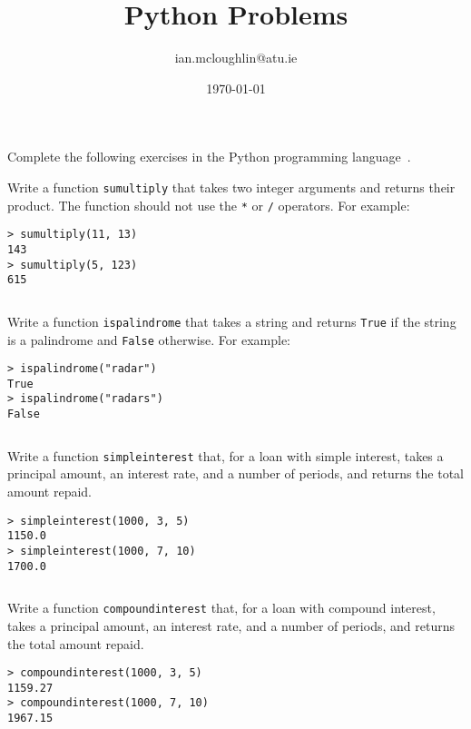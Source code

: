 \documentclass{iansproblems}
\title{Python Problems}
\author{ian.mcloughlin@atu.ie}
\date{\today}
\begin{document}
\maketitle

\noindent
Complete the following exercises in the Python programming language~\autocite{pythonwebsite}.

\begin{questions}

\question
Write a function \texttt{sumultiply} that takes two integer arguments and returns their product.
The function should not use the \texttt{*} or \texttt{/} operators.
For example:
\begin{verbatim}
> sumultiply(11, 13)
143
> sumultiply(5, 123)
615
\end{verbatim}

\begin{solution}
  \inputminted{python}{solutions/sumultiply.py}
\end{solution}


\question
Write a function \texttt{ispalindrome} that takes a string and returns \texttt{True} if the string is a palindrome and \texttt{False} otherwise.
For example:
\begin{verbatim}
> ispalindrome("radar")
True
> ispalindrome("radars")
False
\end{verbatim}

\begin{solution}
  \inputminted{python}{solutions/ispalindrome.py}
\end{solution}

 
\question
Write a function \texttt{simpleinterest} that, for a loan with simple interest, takes a principal amount, an interest rate, and a number of periods, and returns the total amount repaid. 
\begin{verbatim}
> simpleinterest(1000, 3, 5)
1150.0
> simpleinterest(1000, 7, 10)
1700.0
\end{verbatim}

\begin{solution}
  \inputminted{python}{solutions/simpleinterest.py}
\end{solution}


\question
Write a function \texttt{compoundinterest} that, for a loan with compound interest, takes a principal amount, an interest rate, and a number of periods, and returns the total amount repaid. 
\begin{verbatim}
> compoundinterest(1000, 3, 5)
1159.27
> compoundinterest(1000, 7, 10)
1967.15
\end{verbatim}


\end{questions}
\end{document}
